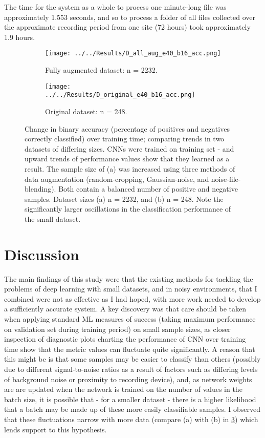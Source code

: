 \documentclass[11pt]{article}
\begin{document}
The time for the system as a whole to process one minute-long file was approximately 1.553 seconds, and so to process a folder of all files collected over the approximate recording period from one site (72 hours) took approximately 1.9 hours.  

\begin{figure}
	\centering
	\begin{subfigure}[t]{\textwidth}
		\centering
		\texttt{[image: ../../Results/D\_all\_aug\_e40\_b16\_acc.png]}
		\caption{Fully augmented dataset: n = 2232.}
		\label{augacc}
	\end{subfigure}
	
	\begin{subfigure}[t]{\textwidth}
	\centering
	\texttt{[image: ../../Results/D\_original\_e40\_b16\_acc.png]}
	\caption{Original dataset: n = 248.}
	\label{nonacc}
	\end{subfigure}
	\caption{Change in binary accuracy (percentage of positives and negatives correctly classified) over training time; comparing trends in two datasets of differing sizes. CNNs were trained on training set - and upward trends of performance values show that they learned as a result. The sample size of (a) was increased using three methods of data augmentation (random-cropping, Gaussian-noise, and noise-file-blending). Both contain a balanced number of positive and negative samples. Dataset sizes (a) n = 2232, and (b) n = 248. Note the significantly larger oscillations in the classification performance of the small dataset.}
	\label{augnonacc}
\end{figure}


\section{Discussion}

The main findings of this study were that the existing methods for tackling the problems of deep learning with small datasets, and in noisy environments, that I combined were not as effective as I had hoped, with more work needed to develop a sufficiently accurate system. A key discovery was that care should be taken when applying standard ML measures of success (taking maximum performance on validation set during training period) on small sample sizes, as closer inspection of diagnostic plots charting the performance of CNN over training time show that the metric values can fluctuate quite significantly. A reason that this might be is that some samples may be easier to classify than others (possibly due to different signal-to-noise ratios as a result of factors such as differing levels of background noise or proximity to recording device), and, as network weights are are updated when the network is trained on the number of values in the batch size, it is possible that - for a smaller dataset - there is a higher likelihood that a batch may be made up of these more easily classifiable samples. I observed that these fluctuations narrow with more data (compare (a) with (b) in \ref{augnonacc}) which lends support to this hypothesis. 
\end{document}
